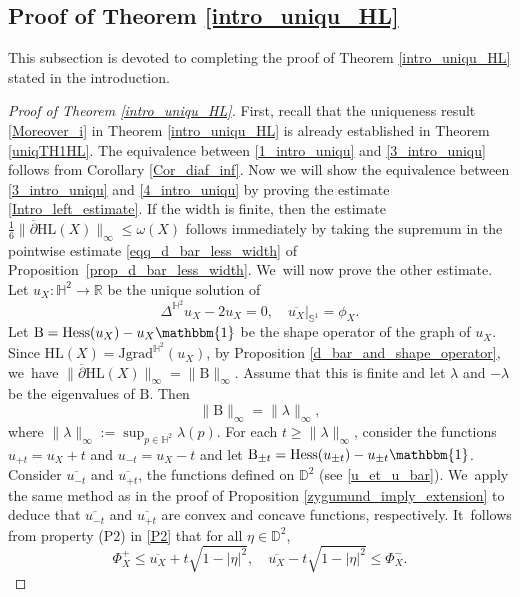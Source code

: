 \documentclass[10pt]{amsart}
\theoremstyle{plain}
\theoremstyle{definition}
\newcommand{\grad}{\mathrm{grad}^{\mathbb{H}^2}}
\newcommand{\J}{\mathrm{J}}
\newcommand{\B}{\mathrm{B}}
\begin{document}
\subsection{Proof of Theorem \ref{intro_uniqu_HL}}
This subsection is devoted to completing the proof of Theorem \ref{intro_uniqu_HL} stated in the introduction.
\begin{proof}[Proof of Theorem \ref{intro_uniqu_HL}]
First, recall that the uniqueness result \eqref{Moreover_i} in Theorem \ref{intro_uniqu_HL} is already established in Theorem \ref{uniqTH1HL}.
The equivalence between \eqref{1_intro_uniqu} and \eqref{3_intro_uniqu} follows from Corollary \ref{Cor_diaf_inf}. Now we will show the equivalence between \eqref{3_intro_uniqu} and \eqref{4_intro_uniqu} by proving the estimate \eqref{Intro_left_estimate}.
If the width is finite, then the estimate \(\frac{1}{6} \lVert \overline{\partial} \mathrm{HL}(X) \rVert_{\infty} \leq \omega(X)\) follows immediately by taking the supremum in the pointwise estimate \eqref{eqq_d_bar_less_width} of Proposition~\ref{prop_d_bar_less_width}. We~will now prove the other estimate. Let \(u_X:\mathbb{H}^2 \to \mathbb{R}\) be the unique solution of
\begin{equation}\label{platau_HPXX}
\Delta^{\mathbb{H}^2} u_X - 2u_X = 0, \quad
\overline{u_X}|_{\mathbb{S}^1} = \phi_X.
\end{equation}
Let \(\B = \mathrm{Hess}(u_X) - u_X \mathbbm{1}\) be the shape operator of the graph of \(u_X\). Since \(\mathrm{HL}(X) = \J\grad(u_X)\), by Proposition \ref{d_bar_and_shape_operator}, we~have \(\lVert \overline{\partial} \mathrm{HL}(X) \rVert_{\infty} = \lVert \B \rVert_{\infty}\). Assume that this is finite and let \(\lambda\) and \(-\lambda\) be the eigenvalues of $\B$. Then
\[
\lVert \B \rVert_{\infty} = \lVert \lambda \rVert_{\infty},
\]
where \(\lVert \lambda \rVert_{\infty} := \sup_{p \in \mathbb{H}^2} \lambda(p).\)
For each \(t \geq \lVert \lambda \rVert_{\infty} \), consider the functions \(u_{+t} = u_X + t \) and \(u_{-t} = u_X - t \) and let \(\B_{\pm t} = \mathrm{Hess}(u_{\pm t}) - u_{\pm t} \mathbbm{1} \). Consider \(\overline{u_{-t}} \) and \(\overline{u_{+t}} \), the functions defined on \(\mathbb{D}^2\) (see \eqref{u_et_u_bar}). We~apply the same method as in the proof of Proposition \ref{zygumund_imply_extension} to deduce that \(\overline{u_{-t}}\) and \(\overline{u_{+t}}\) are convex and concave functions, respectively. It~follows from property ($\mathrm{P2}$) in \ref{P2} that for all \(\eta \in \mathbb{D}^2 \),
\[
\Phi_X^+ \leq \overline{u_X} + t \sqrt{1 - \lvert \eta \rvert^2}, \quad \overline{u_X} - t \sqrt{1 - \lvert \eta \rvert^2} \leq \Phi_X^-.
\]
\end{proof}
\end{document}
